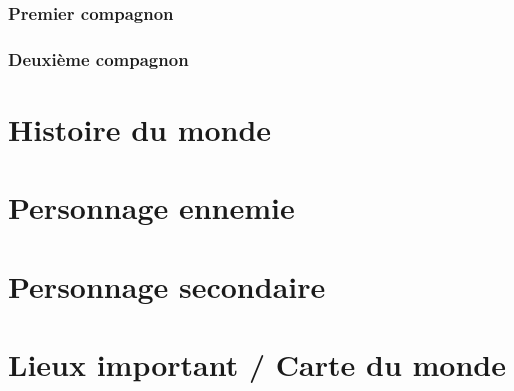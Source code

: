 \subsubsection{Premier compagnon}
\subsubsection{Deuxième compagnon}
\newpage


\section{Histoire du monde} %
\newpage


\section{Personnage ennemie} %
\newpage


\section{Personnage secondaire} %
\newpage


\section{Lieux important / Carte du monde} %
\newpage